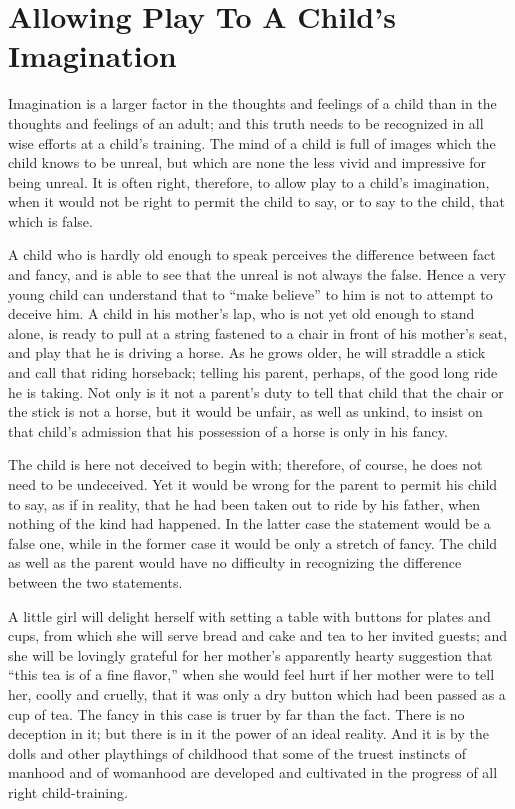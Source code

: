 \documentclass[
]{book}
\begin{document}
\hypertarget{allowing-play-to-a-childs-imagination}{%
\chapter{Allowing Play To A Child's Imagination}\label{allowing-play-to-a-childs-imagination}}

Imagination is a larger factor in the thoughts and feelings of a child than in the thoughts and feelings of an adult; and this truth needs to be recognized in all wise efforts at a child's training. The mind of a child is full of images which the child knows to be unreal, but which are none the less vivid and impressive for being unreal. It is often right, therefore, to allow play to a child's imagination, when it would not be right to permit the child to say, or to say to the child, that which is false.

A child who is hardly old enough to speak perceives the difference between fact and fancy, and is able to see that the unreal is not always the false. Hence a very young child can understand that to ``make believe'' to him is not to attempt to deceive him. A child in his mother's lap, who is not yet old enough to stand alone, is ready to pull at a string fastened to a chair in front of his mother's seat, and play that he is driving a horse. As he grows older, he will straddle a stick and call that riding horseback; telling his parent, perhaps, of the good long ride he is taking. Not only is it not a parent's duty to tell that child that the chair or the stick is not a horse, but it would be unfair, as well as unkind, to insist on that child's admission that his possession of a horse is only in his fancy.

The child is here not deceived to begin with; therefore, of course, he does not need to be undeceived. Yet it would be wrong for the parent to permit his child to say, as if in reality, that he had been taken out to ride by his father, when nothing of the kind had happened. In the latter case the statement would be a false one, while in the former case it would be only a stretch of fancy. The child as well as the parent would have no difficulty in recognizing the difference between the two statements.

A little girl will delight herself with setting a table with buttons for plates and cups, from which she will serve bread and cake and tea to her invited guests; and she will be lovingly grateful for her mother's apparently hearty suggestion that ``this tea is of a fine flavor,'' when she would feel hurt if her mother were to tell her, coolly and cruelly, that it was only a dry button which had been passed as a cup of tea. The fancy in this case is truer by far than the fact. There is no deception in it; but there is in it the power of an ideal reality. And it is by the dolls and other playthings of childhood that some of the truest instincts of manhood and of womanhood are developed and cultivated in the progress of all right child-training.
\end{document}
